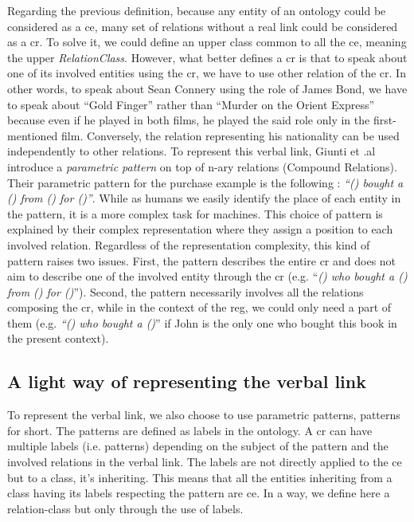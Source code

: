 Regarding the previous definition, because any entity of an ontology could be considered as a \acrshort{ce}, many set of relations without a real link could be considered as a \acrshort{cr}. To solve it, we could define an upper class common to all the \acrshort{ce}, meaning the upper \textit{RelationClass}. However, what better defines a \acrshort{cr} is that to speak about one of its involved entities using the \acrshort{cr}, we have to use other relation of the \acrshort{cr}. In other words, to speak about Sean Connery using the role of James Bond, we have to speak about ``Gold Finger'' rather than ``Murder on the Orient Express'' because even if he played in both films, he played the said role only in the first-mentioned film. Conversely, the relation representing his nationality can be used independently to other relations. To represent this verbal link, Giunti et .al \cite{giunti_2019_representing} introduce a \textit{parametric pattern} on top of n-ary relations (Compound Relations). Their parametric pattern for the purchase example is the following : \textit{``() bought a () from () for ()''}. While as humans we easily identify the place of each entity in the pattern, it is a more complex task for machines. This choice of pattern is explained by their complex representation where they assign a position to each involved relation. Regardless of the representation complexity, this kind of pattern raises two issues. First, the pattern describes the entire \acrshort{cr} and does not aim to describe one of the involved entity through the \acrshort{cr} (e.g. ``\textit{() who bought a () from () for ()}''). Second, the pattern necessarily involves all the relations composing the \acrshort{cr}, while in the context of the \acrshort{reg}, we could only need a part of them (e.g. \textit{``() who bought a ()}'' if John is the only one who bought this book in the present context).

\subsection{A light way of representing the verbal link}

To represent the verbal link, we also choose to use parametric patterns, patterns for short. The patterns are defined as labels in the ontology. A \acrshort{cr} can have multiple labels (i.e. patterns) depending on the subject of the pattern and the involved relations in the verbal link. The labels are not directly applied to the \acrshort{ce} but to a class, it's inheriting. This means that all the entities inheriting from a class having its labels respecting the pattern are \acrshort{ce}. In a way, we define here a relation-class but only through the use of labels.

